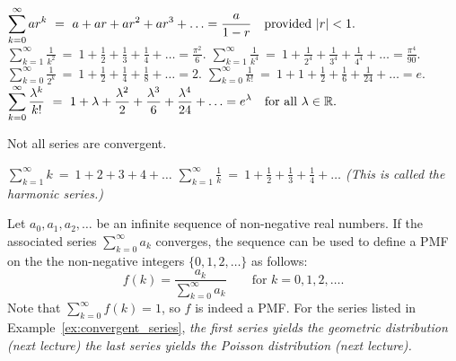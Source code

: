 \begin{example}\label{ex:convergent_series}
\ben
\it 
$\displaystyle\sum_{k=0}^{\infty} ar^k 					\ =\ a + ar + ar^2 + ar^3 + \ldots = \frac{a}{1-r} \text{\quad provided $|r|<1$}.$
\it
$\displaystyle\sum_{k=1}^{\infty} \frac{1}{k^2}			\ =\ 1 + \frac{1}{2} + \frac{1}{3} + \frac{1}{4} + \ldots = \frac{\pi^2}{6}.$
\it
$\displaystyle\sum_{k=1}^{\infty} \frac{1}{k^4}			\ =\ 1 + \frac{1}{2^4} + \frac{1}{3^4} + \frac{1}{4^4} + \ldots = \frac{\pi^4}{90}.$
\it
$\displaystyle\sum_{k=0}^{\infty} \frac{1}{2^k}			\ =\ 1 + \frac{1}{2} + \frac{1}{4} + \frac{1}{8} + \ldots = 2.$
\it
$\displaystyle\sum_{k=0}^{\infty} \frac{1}{k!}				\ =\ 1 + 1 + \frac{1}{2} + \frac{1}{6} + \frac{1}{24} + \ldots = e.$
\it
$\displaystyle\sum_{k=0}^{\infty} \frac{\lambda^k}{k!} 	\ =\ 1 + \lambda + \frac{\lambda^2}{2} + \frac{\lambda^3}{6} + \frac{\lambda^4}{24} + \ldots = e^{\lambda} \text{\quad for all $\lambda\in\mathbb{R}$}.$
\een
\end{example}

Not all series are convergent.
\begin{example}
\mbox{}\vspace*{-4ex}
\ben
\it $\displaystyle\sum_{k=1}^{\infty} k 					\ =\ 1 + 2 + 3 + 4 + \ldots$
\it $\displaystyle\sum_{k=1}^{\infty} \frac{1}{k} 		\ =\ 1 + \frac{1}{2} + \frac{1}{3} + \frac{1}{4} + \ldots$ \qquad (This is called the \emph{harmonic series}.)
\een 

\end{example}

Let $a_0,a_1,a_2,\ldots$ be an infinite sequence of non-negative real numbers. If the associated series $\sum_{k=0}^{\infty} a_k$ converges, the sequence can be used to define a PMF on the the non-negative integers $\{0,1,2,\ldots\}$ as follows:
\[
f(k) = \frac{a_k}{\sum_{k=0}^{\infty} a_k} \qquad\text{for $k=0,1,2,\ldots$.}
\]
Note that $\sum_{k=0}^{\infty} f(k) = 1$, so $f$ is indeed a PMF. For the series listed in Example~\ref{ex:convergent_series},
\bit
\it the first series yields the \emph{geometric distribution} (next lecture)
\it the last series yields the \emph{Poisson distribution} (next lecture).
\eit
%


